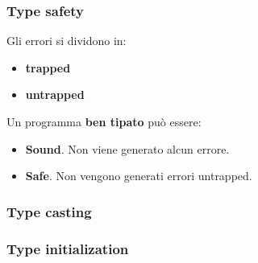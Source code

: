 \documentclass{beamer}
\newcommand{\textcode}[1]{\colorbox{backcolour}{\texttt{#1}}}
\begin{document}
\begin{frame}
    \frametitle{Type safety}
    Gli errori si dividono in:
    \begin{itemize}
        \item \textbf{trapped}
        \item \textbf{untrapped}
    \end{itemize}
    Un programma \textbf{ben tipato} può essere:
    \begin{itemize}
        \item \textbf{Sound}. Non viene generato alcun errore.
        \item \textbf{Safe}. Non vengono generati errori untrapped.
    \end{itemize}
\end{frame}


\begin{frame}
    \frametitle{Type casting}
    
    
\end{frame}


%    

\begin{frame}
    \frametitle{Type initialization}
    
    
\end{frame}
\end{document}
